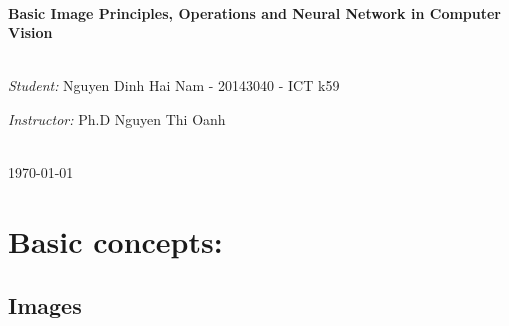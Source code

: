 \begin{titlepage}
\HRule \\[0.4cm]
{ \Large \bfseries Basic Image Principles, Operations and Neural Network in Computer Vision}\\[0.03cm] %
\HRule \\[1.cm]

 

\begin{minipage}{1\textwidth}
\begin{flushleft} \large 
\emph{Student:}
Nguyen Dinh Hai Nam - 20143040 - ICT k59\\ %

\end{flushleft}
\begin{flushleft} \large
\emph{Instructor:}
Ph.D Nguyen Thi Oanh
\end{flushleft}
\end{minipage}\\[2cm]



{\large \today}\\[1cm] %



\vfill %

\end{titlepage}
\tableofcontents
\pagebreak

\section{Basic concepts:}
\subsection{Images}
